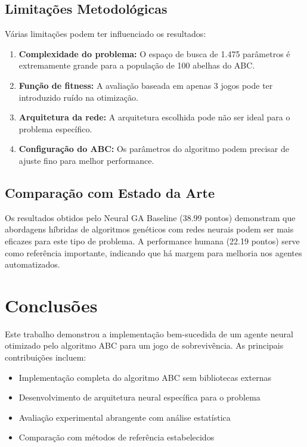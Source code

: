 \documentclass[review]{elsarticle}
\begin{document}
\subsection{Limitações Metodológicas}

Várias limitações podem ter influenciado os resultados:

\begin{enumerate}
\item \textbf{Complexidade do problema:} O espaço de busca de 1.475 parâmetros é extremamente grande para a população de 100 abelhas do ABC.
\item \textbf{Função de fitness:} A avaliação baseada em apenas 3 jogos pode ter introduzido ruído na otimização.
\item \textbf{Arquitetura da rede:} A arquitetura escolhida pode não ser ideal para o problema específico.
\item \textbf{Configuração do ABC:} Os parâmetros do algoritmo podem precisar de ajuste fino para melhor performance.
\end{enumerate}

\subsection{Comparação com Estado da Arte}

Os resultados obtidos pelo Neural GA Baseline (38.99 pontos) demonstram que abordagens híbridas de algoritmos genéticos com redes neurais podem ser mais eficazes para este tipo de problema. A performance humana (22.19 pontos) serve como referência importante, indicando que há margem para melhoria nos agentes automatizados.

\section{Conclusões}

Este trabalho demonstrou a implementação bem-sucedida de um agente neural otimizado pelo algoritmo ABC para um jogo de sobrevivência. As principais contribuições incluem:

\begin{itemize}
\item Implementação completa do algoritmo ABC sem bibliotecas externas
\item Desenvolvimento de arquitetura neural específica para o problema
\item Avaliação experimental abrangente com análise estatística
\item Comparação com métodos de referência estabelecidos
\end{itemize}
\end{document}
